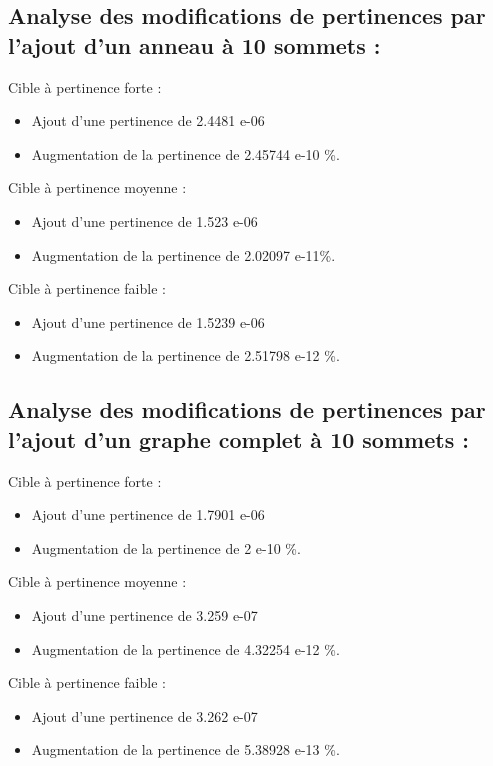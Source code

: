 \documentclass[a4paper,11pt]{article}
\begin{document}
	\subsection{Analyse des modifications de pertinences par l'ajout d'un anneau à 10 sommets :}
	Cible à pertinence forte :
		\begin{itemize} 	
			\item Ajout d'une pertinence de 2.4481 e-06
			\item Augmentation de la pertinence de 2.45744 e-10 \%.
		\end{itemize}
		Cible à pertinence moyenne :
		\begin{itemize} 	
			\item Ajout d'une pertinence de 1.523 e-06
			\item Augmentation de la pertinence de 2.02097 e-11\%.
		\end{itemize}
		Cible à pertinence faible :
		\begin{itemize} 	
			\item Ajout d'une pertinence de 1.5239 e-06
			\item Augmentation de la pertinence de 2.51798 e-12 \%.
		\end{itemize}

	\subsection{Analyse des modifications de pertinences par l'ajout d'un graphe complet à 10 sommets :}
		Cible à pertinence forte :
		\begin{itemize} 	
			\item Ajout d'une pertinence de 1.7901 e-06
			\item Augmentation de la pertinence de 2 e-10 \%.
		\end{itemize}
		Cible à pertinence moyenne :
		\begin{itemize} 	
			\item Ajout d'une pertinence de 3.259 e-07
			\item Augmentation de la pertinence de 4.32254 e-12 \%.
		\end{itemize}
		Cible à pertinence faible :
		\begin{itemize} 	
			\item Ajout d'une pertinence de 3.262 e-07
			\item Augmentation de la pertinence de 5.38928 e-13 \%.
		\end{itemize}
\end{document}
